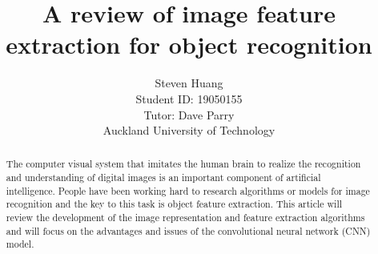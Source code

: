 \documentclass[10pt, a4paper]{article}
\title{A review of image feature extraction for object recognition}
\date{}
\author{Steven Huang \\ Student ID: 19050155 \\Tutor: Dave Parry\\Auckland University of Technology}
\begin{document}
	\maketitle
 	
	\begin{multicols}{2}
	\begin{abstract} \justify %
	The computer visual system that imitates the human brain to realize the recognition and understanding of digital images is an important component of artificial intelligence. People have been working hard to research algorithms or models for image recognition and the key to this task is object feature extraction. This article will review the development of the image representation and feature extraction algorithms and will focus on the advantages and issues of the convolutional neural network (CNN) model.
	\end{abstract}


	\setlength{\lineskip}{3em}     	%
	\setlength{\parskip}{0.5em}     %

\end{multicols}
\end{document}
